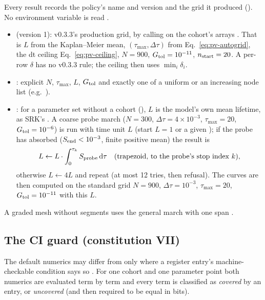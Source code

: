 Every result records the policy's name and version and the grid it produced (). No environment
variable is read .
\begin{itemize}[nosep]
  \item \textbf{} (version 1): v0.3.3's production grid, by calling
     on the cohort's arrays . That is $L$ from the
    Kaplan--Meier mean, $(\tau_{\max},\Delta\tau)$ from Eq.~\eqref{eq:pv-autogrid}, the dt ceiling
    Eq.~\eqref{eq:pv-ceiling}, $N=900$, $G_{\rm tol}=10^{-11}$, $n_{\rm start}=20$. A per-row $\delta$ has no v0.3.3
    rule; the ceiling then uses $\min_i\delta_i$.
  \item \textbf{}: explicit $N$, $\tau_{\max}$, $L$, $G_{\rm tol}$ and exactly one of a uniform
     or an increasing node list  (e.g.\ ).
  \item \textbf{}: for a parameter set without a cohort (), $L$ is the model's own mean
    lifetime, as SRK's  . A coarse probe march
    ($N=300$, $\Delta\tau=4\times10^{-3}$, $\tau_{\max}=20$, $G_{\rm tol}=10^{-6}$) is run with time unit $L$ (start $L=1$ or a
    given ); if the probe has absorbed ($S_{\rm end}<10^{-3}$, finite positive mean) the result is
    \begin{equation}
      L\leftarrow L\cdot\int_0^{\tau_k}S_{\rm probe}\,\mathrm{d}\tau\quad(\text{trapezoid, to the probe's stop index }k),
    \end{equation}
    otherwise $L\leftarrow4L$ and repeat (at most 12 tries, then refusal). The curves are then computed on the standard grid
    $N=900$, $\Delta\tau=10^{-3}$, $\tau_{\max}=20$, $G_{\rm tol}=10^{-11}$ with this $L$.
\end{itemize}
A graded mesh without segments uses the general march with one span .

\subsection{The CI guard (constitution VII)}\label{sec:fp-guard}

The default numerics may differ from  only where a register entry's machine-checkable condition says so
. For one cohort and one parameter point both numerics are evaluated term by term
and every term is classified as \emph{covered} by an entry, or \emph{uncovered} (and then required to be equal in bits).

